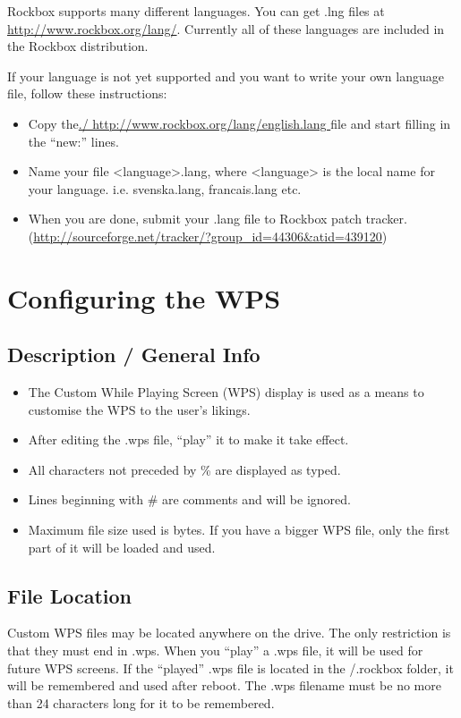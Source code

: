 Rockbox supports many different languages. You can get .lng files at
\url{http://www.rockbox.org/lang/}. 
Currently all of these languages are included in the Rockbox
distribution.

If your language is not yet supported and you want to write your own
language file,  follow these instructions:

\begin{itemize}
\item Copy the\url{./ http://www.rockbox.org/lang/english.lang }file and start filling in the ``new:'' lines. 
\item Name your file {\textless}language{\textgreater}.lang, where
{\textless}language{\textgreater} is the local name for your language. i.e. svenska.lang, francais.lang etc. 
\item When you are done, submit your .lang file to Rockbox patch
tracker.
(\url{http://sourceforge.net/tracker/?group_id=44306&atid=439120})
\end{itemize}

\section{\label{ref:ConfiguringtheWPS}Configuring the WPS}

\subsection{Description / General Info}

\begin{itemize}
\item The Custom While Playing Screen (WPS) display is used as a means to customise the WPS to the user's likings.
\item After editing the .wps file, ``play'' it to make it take effect.
\item All characters not preceded by \% are displayed as typed.
\item Lines beginning with \# are comments and will be ignored.
\item Maximum file size used is  bytes. If you have a bigger WPS file, only the first part of it will be loaded and used.
\end{itemize}

\subsection{File Location}
Custom WPS files may be located anywhere on the drive. The only restriction is that they must end in .wps. When you ``play'' a .wps file, it will be used for future WPS screens. If the ``played'' .wps file is located in the /.rockbox folder, it will be remembered and used after reboot. The .wps filename must be no more than 24 characters long for it to be remembered.

